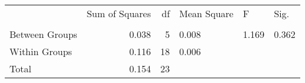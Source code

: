 \begin{tabular}{lrrlll}
\toprule
 & Sum of Squares & df & Mean Square & F & Sig. \\
 &  &  &  &  &  \\
\midrule
Between Groups & 0.038 & 5 & 0.008 & 1.169 & 0.362 \\
Within Groups & 0.116 & 18 & 0.006 &  &  \\
Total & 0.154 & 23 &  &  &  \\
\bottomrule
\end{tabular}
